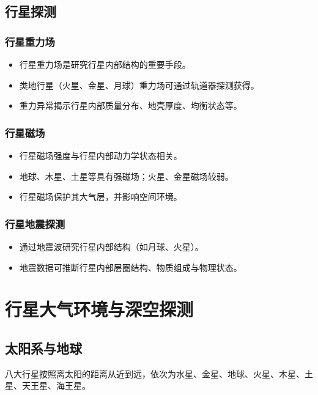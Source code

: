 \documentclass[12pt,a4paper]{article}
\begin{document}
	\subsection{行星探测}
	
	\subsubsection{行星重力场}
	\begin{itemize}
		\item 行星重力场是研究行星内部结构的重要手段。
		\item 类地行星（火星、金星、月球）重力场可通过轨道器探测获得。
		\item 重力异常揭示行星内部质量分布、地壳厚度、均衡状态等。
	\end{itemize}
	
	\subsubsection{行星磁场}
	\begin{itemize}
		\item 行星磁场强度与行星内部动力学状态相关。
		\item 地球、木星、土星等具有强磁场；火星、金星磁场较弱。
		\item 行星磁场保护其大气层，并影响空间环境。
	\end{itemize}
	
	\subsubsection{行星地震探测}
	\begin{itemize}
		\item 通过地震波研究行星内部结构（如月球、火星）。
		\item 地震数据可推断行星内部层圈结构、物质组成与物理状态。
	\end{itemize}
	
	\section{行星大气环境与深空探测}
	
	\subsection{太阳系与地球}
	
	八大行星按照离太阳的距离从近到远，依次为水星、金星、地球、火星、木星、土星、天王星、海王星。
	
\end{document}

